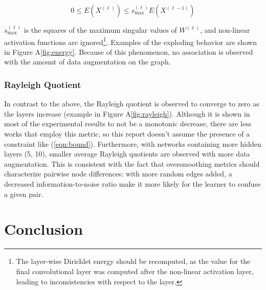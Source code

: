 \documentclass[11pt]{article}
\begin{document}
\begin{equation}
\label{eqn:bound}
    0 \leq E(X^{(\ell)}) \leq s^{(\ell)}_\text{max} E(X^{(\ell - 1)})
\end{equation}

$s^{(\ell)}_\text{max}$ is the squares of the maximum singular values of $W^{(\ell)}$, and non-linear activation functions are ignored\footnote{The layer-wise Dirichlet energy should be recomputed, as the value for the final convolutional layer was computed after the non-linear activation layer, leading to inconsistencies with respect to the layer.}. Examples of the exploding behavior are shown in Figure A\ref{fig:energy}. Because of this phenomenon, no association is observed with the amount of data augmentation on the graph. 

\subsubsection{Rayleigh Quotient}

In contrast to the above, the Rayleigh quotient is observed to converge to zero as the layers increase (example in Figure A\ref{fig:rayleigh}). Although it is shown in most of the experimental results to not be a monotonic decrease, there are less works that employ this metric, so this report doesn't assume the presence of a constraint like (\ref{eqn:bound}). Furthermore, with networks containing more hidden layers (5, 10), smaller average Rayleigh quotients are observed with more data augmentation. This is consistent with the fact that oversmoothing metrics should characterize pairwise node differences: with more random edges added, a decreased information-to-noise ratio  make it more likely for the learner to confuse a given pair.

\section{Conclusion}
\end{document}
